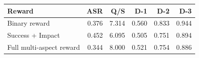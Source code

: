\begin{tabular}{lrrrrr}
\toprule
Reward & ASR & Q/S & D-1 & D-2 & D-3 \\
\midrule
Binary reward & 0.376 & 7.314 & 0.560 & 0.833 & 0.944 \\
Success + Impact & 0.452 & 6.095 & 0.505 & 0.751 & 0.894 \\
Full multi-aspect reward & 0.344 & 8.000 & 0.521 & 0.754 & 0.886 \\
\bottomrule
\end{tabular}
